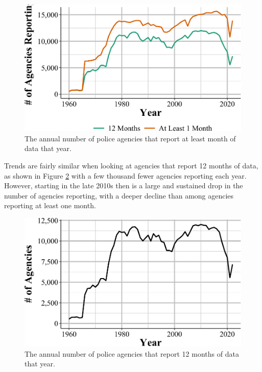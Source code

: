 \documentclass[
  12pt,
  openany]{book}
\begin{document}
\begin{figure}

{\centering \includegraphics[width=0.9\linewidth]{04_stolen_property_files/figure-latex/propertyAgencies-1} 

}

\caption{The annual number of police agencies that report at least month of data that year.}\label{fig:propertyAgencies}
\end{figure}

Trends are fairly similar when looking at agencies that report 12 months of data, as shown in Figure \ref{fig:propertyAgencies12Month} with a few thousand fewer agencies reporting each year. However, starting in the late 2010s then is a large and sustained drop in the number of agencies reporting, with a deeper decline than among agencies reporting at least one month.

\begin{figure}

{\centering \includegraphics[width=0.9\linewidth]{04_stolen_property_files/figure-latex/propertyAgencies12Month-1} 

}

\caption{The annual number of police agencies that report 12 months of data that year.}\label{fig:propertyAgencies12Month}
\end{figure}
\end{document}
